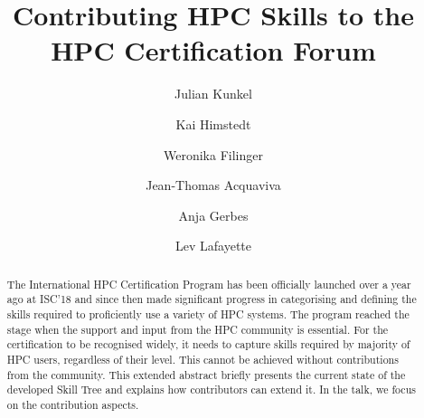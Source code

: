\documentclass[jocse]{jocseart}
\begin{document}
\title{Contributing HPC Skills to the HPC Certification Forum}

\author{Julian Kunkel}


\author{Kai Himstedt}

\author{Weronika Filinger}

\author{Jean-Thomas Acquaviva}


\author{Anja Gerbes}

\author{Lev Lafayette}

\renewcommand{\shortauthors}{J. Kunkel et al.}


\begin{abstract}
The International HPC Certification Program has been officially launched over a year ago at ISC’18 and since then made significant progress in categorising and defining the skills required to proficiently use a variety of HPC systems. The program reached the stage when the support and input from the HPC community is essential.
For the certification to be recognised widely, it needs to capture skills required by majority of HPC users, regardless of their level. This cannot be achieved without contributions from the community. This extended abstract briefly presents the current state of the developed Skill Tree and explains how contributors can extend it.
In the talk, we focus on the contribution aspects.
\end{abstract}

%
%
\begin{CCSXML}
\end{CCSXML}



\keywords{}
\end{document}
